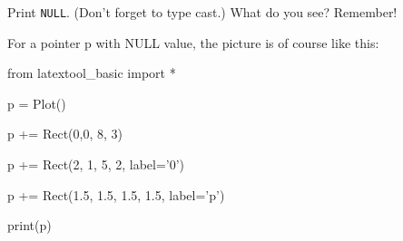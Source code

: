 Print \texttt{NULL}. (Don't forget to type cast.) What do you see? Remember!



For a pointer p with NULL value, the picture is of course like this:

\begin{python}

from latextool_basic import *

p = Plot()



p += Rect(0,0, 8, 3)

p += Rect(2, 1, 5, 2, label='0')

p += Rect(1.5, 1.5, 1.5, 1.5, label='p')



print(p)

\end{python}

